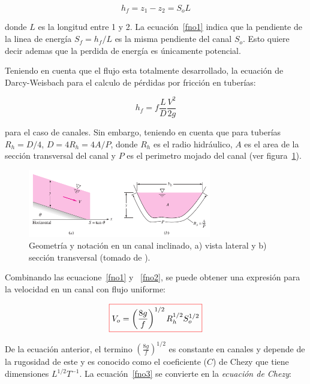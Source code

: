\documentclass[11pt, oneside]{article}
\begin{document}
\begin{equation}
h_f = z_1 - z_2 = S_o L
\label{fno1}
\end{equation}

donde $L$ es la longitud entre 1 y 2. La ecuaci\'on~\ref{fno1} indica que la pendiente de la linea de energ\'ia $S_f = h_f /L$ es la misma pendiente del canal $S_o$. Esto quiere decir ademas que la perdida de energ\'ia es \'unicamente potencial. 

Teniendo en cuenta que el flujo esta totalmente desarrollado, la ecuaci\'on de Darcy-Weisbach para el calculo de p\'erdidas por fricci\'on en tuber\'ias:

\begin{equation}
h_f = f \frac{L}{D}\frac{V^2}{2g}
\label{fno2}
\end{equation}

para el caso de canales. Sin embargo, teniendo en cuenta que para tuber\'ias $R_h =D/4$, $D = 4R_h = 4A/P$, donde $R_h$ es el radio hidr\'aulico, $A$ es el area de la secci\'on transversal del canal y $P$ es el perimetro mojado del canal (ver figura~\ref{fnor2}).

\begin{figure}[h]
\centering
\includegraphics[width=8cm]{fnor2.png}
\caption{Geometr\'ia y notaci\'on en un canal inclinado, a) vista lateral y b) secci\'on transversal (tomado de \cite{white1990fluid}).}
\label{fnor2}
\end{figure}

Combinando las ecuacione~\ref{fno1} y ~\ref{fno2}, se puede obtener una expresi\'on para la velocidad en un canal con flujo uniforme:

\begin{equation}
\color{red}\boxed{\color{black} V_o = \left( \frac{8g}{f} \right)^{1/2} R_h^{1/2} S_o^{1/2} }
\label{fno3}
\end{equation}

De la ecuaci\'on anterior, el termino $\left( \frac{8g}{f} \right)^{1/2}$ es constante en canales y depende de la rugosidad de este y es conocido como el coeficiente ($C$) de Chezy que tiene dimensiones $L^{1/2} T^{-1}$. La ecuaci\'on~\ref{fno3} se convierte en la \emph{ecuaci\'on de Chezy}:
\end{document}
